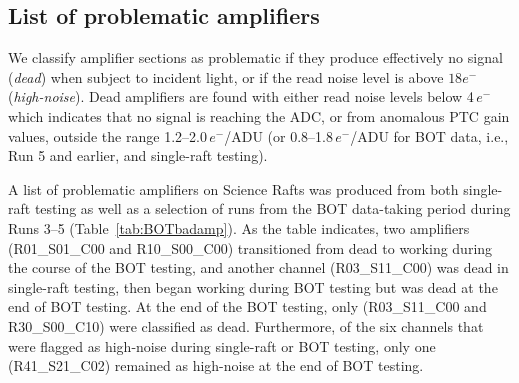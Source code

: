 \clearpage
\subsection{List of problematic amplifiers}\label{deadamplifiers}

We classify amplifier sections as problematic if they produce effectively no signal ({\it dead}) when subject to incident light, or if the read noise level is above $18e^{-}$ ({\it high-noise}).  Dead amplifiers are found with either read noise levels below 4\,$e^{-}$ which indicates that no signal is reaching the ADC, or from anomalous PTC gain values, outside the range 1.2--2.0\,$e^{-}$/ADU (or 0.8--1.8\,$e^{-}$/ADU for BOT data, i.e., Run 5 and earlier, and single-raft testing). 

A list of problematic amplifiers on Science Rafts was produced from both single-raft testing as well as a selection of runs from the BOT data-taking period during Runs 3--5 (Table~\ref{tab:BOTbadamp}). As the table indicates, two amplifiers (R01\_S01\_C00 and R10\_S00\_C00) transitioned from dead to working during the course of the BOT testing, and another channel (R03\_S11\_C00) was dead in single-raft testing, then began working during BOT testing but was dead at the end of BOT testing. At the end of the BOT testing, only (R03\_S11\_C00 and R30\_S00\_C10) were classified as dead. Furthermore, of the six channels that were flagged as high-noise during single-raft or BOT testing, only one (R41\_S21\_C02) remained as high-noise at the end of BOT testing.

